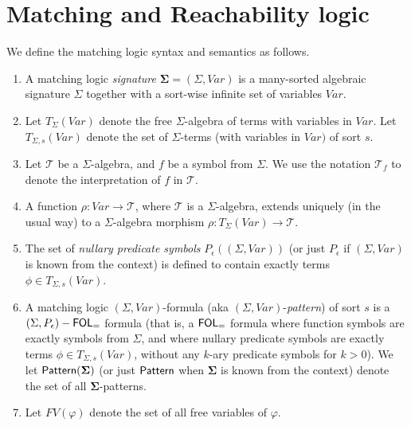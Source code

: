\section{Matching and Reachability logic}\label{app:MLandRL}

\begin{definition}\label{def:matchinglogic}
We define the matching logic syntax and semantics as follows.
\begin{enumerate}
    \item A matching logic \emph{signature} $\mathbf{\Sigma} = (\Sigma, \mathit{Var})$ is a many-sorted algebraic signature $\Sigma$ together with a sort-wise infinite set of variables $\mathit{Var}$.
    \item Let $T_{\Sigma}(\mathit{Var})$ denote the free $\Sigma$-algebra of terms with variables 
          in $\mathit{Var}$.
          Let $T_{\Sigma, s}(\mathit{Var})$ denote the set of $\Sigma$-terms (with variables in $\mathit{Var})$ of sort $s$.
    \item Let $\mathcal{T}$ be a $\Sigma$-algebra, and $f$ be a symbol from $\Sigma$.
          We use the notation $\mathcal{T}_f$ to denote the interpretation of $f$ in $\mathcal{T}$.
    \item A function $\rho : \mathit{Var} \to \mathcal{T}$, where $\mathcal{T}$ is a $\Sigma$-algebra,
          extends uniquely (in the usual way) to a $\Sigma$-algebra morphism
          $\rho : T_{\Sigma}(\mathit{Var}) \to \mathcal{T}$.
    \item The set of \emph{nullary predicate symbols} $P_\epsilon((\Sigma, \mathit{Var}))$
          (or just $P_\epsilon$ if $(\Sigma, \mathit{Var})$ is known from the context) is
          defined to contain exactly terms $\phi \in T_{\Sigma, s}(\mathit{Var})$.
    \item A matching logic $(\Sigma, \mathit{Var})$-formula (aka $(\Sigma, \mathit{Var})$-\emph{pattern})
          of sort $s$
          is a $(\Sigma, P_\epsilon)-\mathsf{FOL}_{=}$ formula (that is, a $\mathsf{FOL}_{=}$ formula where function symbols are
          exactly symbols from $\Sigma$, and where nullary predicate symbols are exactly
          terms $\phi \in T_{\Sigma, s}(\mathit{Var})$, without any $k$-ary predicate symbols for $k > 0$).
          We let $\mathsf{Pattern}(\mathbf{\Sigma})$ (or just $\mathsf{Pattern}$ when $\mathbf{\Sigma}$ is known from the context)
          denote the set of all $\mathbf{\Sigma}$-patterns.
    \item Let $\mathit{FV}(\varphi)$ denote the set of all free variables of $\varphi$.

\end{enumerate}
\end{definition}
